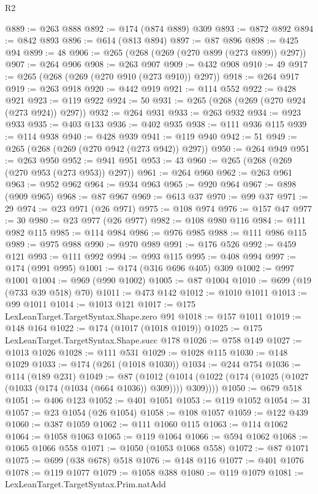 \begin{lexlean}{R2}
\begin{coremodule}
{{{{{{{{{{{{{{{{{{{{{{{{{{{{{{{{{{{{{{{{{{{{{{{{{{{{{{{{{{{{{{{{{{{{{{{{{{{{{{{{{{{{{{{{{{{{{{{{{{{{{{{{{{{{{{{{{{{{{{{{{{{{{{{{{{{{{{{{{{{{@889 := @263 @888
@892 := @174 (@874 @889) @309
@893 := @872 @892
@894 := @842 @893
@896 := @614 (@813 @894)
@897 := @87 @896
@898 := @425 @94
@899 := 48
@906 := @265 (@268 (@269 (@270 @899 (@273 @899)) @297))
@907 := @264 @906
@908 := @263 @907
@909 := @432 @908
@910 := 49
@917 := @265 (@268 (@269 (@270 @910 (@273 @910)) @297))
@918 := @264 @917
@919 := @263 @918
@920 := @442 @919
@921 := @114 @552
@922 := @428 @921
@923 := @119 @922
@924 := 50
@931 := @265 (@268 (@269 (@270 @924 (@273 @924)) @297))
@932 := @264 @931
@933 := @263 @932
@934 := @923 @933
@935 := @403 @133
@936 := @402 @935
@938 := @111 @936 @115
@939 := @114 @938
@940 := @428 @939
@941 := @119 @940
@942 := 51
@949 := @265 (@268 (@269 (@270 @942 (@273 @942)) @297))
@950 := @264 @949
@951 := @263 @950
@952 := @941 @951
@953 := 43
@960 := @265 (@268 (@269 (@270 @953 (@273 @953)) @297))
@961 := @264 @960
@962 := @263 @961
@963 := @952 @962
@964 := @934 @963
@965 := @920 @964
@967 := @898 (@909 @965)
@968 := @87 @967
@969 := @613 @37
@970 := @99 @37
@971 := 29
@974 := @23 @971 (@26 @971)
@975 := @108 @974
@976 := @157 @47
@977 := 30
@980 := @23 @977 (@26 @977)
@982 := @108 @980 @116
@984 := @111 @982 @115
@985 := @114 @984
@986 := @976 @985
@988 := @111 @986 @115
@989 := @975 @988
@990 := @970 @989
@991 := @176 @526
@992 := @459 @121
@993 := @111 @992
@994 := @993 @115
@995 := @408 @994
@997 := @174 (@991 @995)
@1001 := @174 (@316 @696 @405) @309
@1002 := @997 @1001
@1004 := @969 (@990 @1002)
@1005 := @87 @1004
@1010 := @699 (@19 (@733 @39 @518) @70)
@1011 := @473 @142
@1012 := @1010 @1011
@1013 := @99 @1011
@1014 := @1013 @121
@1017 := @175 LexLeanTarget.TargetSyntax.Shape.zero @91
@1018 := @157 @1011
@1019 := @148 @164
@1022 := @174 (@1017 (@1018 @1019))
@1025 := @175 LexLeanTarget.TargetSyntax.Shape.succ @178
@1026 := @758 @149
@1027 := @1013 @1026
@1028 := @111 @531
@1029 := @1028 @115
@1030 := @148 @1029
@1033 := @174 (@261 (@1018 @1030))
@1034 := @244 @754
@1036 := @114 (@189 @231)
@1049 := @87
    (@1012 (@1014 (@1022 (@174 (@1025 (@1027 (@1033 (@174 (@1034 (@664 @1036)) @309)))) @309))))
@1050 := @679 @518
@1051 := @406 @123
@1052 := @401 @1051
@1053 := @119 @1052
@1054 := 31
@1057 := @23 @1054 (@26 @1054)
@1058 := @108 @1057
@1059 := @122 @439
@1060 := @387 @1059
@1062 := @111 @1060 @115
@1063 := @114 @1062
@1064 := @1058 @1063
@1065 := @119 @1064
@1066 := @594 @1062
@1068 := @1065 @1066 @558
@1071 := @1050 (@1053 @1068 @558)
@1072 := @87 @1071
@1075 := @699 (@38 @678) @518
@1076 := @148 @116
@1077 := @401 @1076
@1078 := @119 @1077
@1079 := @1058 @388
@1080 := @119 @1079
@1081 := LexLeanTarget.TargetSyntax.Prim.natAdd
}}}}}}}}}}}}}}}}}}}}}}}}}}}}}}}}}}}}}}}}}}}}}}}}}}}}}}}}}}}}}}}}}}}}}}}}}}}}}}}}}}}}}}}}}}}}}}}}}}}}}}}}}}}}}}}}}}}}}}}}}}}}}}}}}}}}}}}}}}}}
\end{coremodule}
\end{lexlean}
